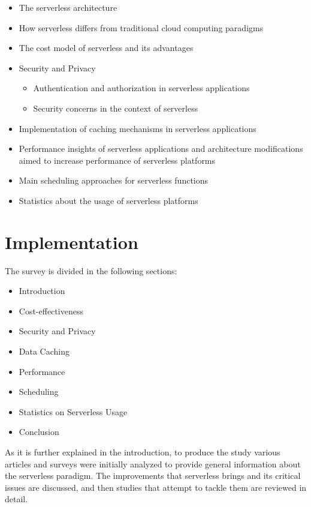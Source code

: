 \documentclass{scrartcl}
\begin{document}
\begin{itemize}
  \item The serverless architecture
  \item How serverless differs from traditional cloud computing paradigms
  \item The cost model of serverless and its advantages
  \item Security and Privacy
  \begin{itemize}
    \item Authentication and authorization in serverless applications
    \item Security concerns in the context of serverless
  \end{itemize}
  \item Implementation of caching mechanisms in serverless applications
  \item Performance insights of serverless applications and architecture modifications aimed to increase performance of serverless platforms
  \item Main scheduling approaches for serverless functions
  \item Statistics about the usage of serverless platforms
\end{itemize}

\newpage
\section{Implementation}
The survey is divided in the following sections:

\begin{itemize}
  \item Introduction
  \item Cost-effectiveness 
  \item Security and Privacy 
  \item Data Caching 
  \item Performance 
  \item Scheduling 
  \item Statistics on Serverless Usage 
  \item Conclusion
\end{itemize}

As it is further explained in the introduction, to produce the study various articles and surveys were initially analyzed to provide general information about the serverless paradigm. The improvements that serverless brings and its critical issues are discussed, and then studies that attempt to tackle them are reviewed in detail.
\end{document}
